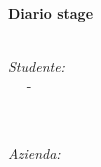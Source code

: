 \begin{titlepage}
    \HRule \\[0.4cm]
    { \huge \bfseries Diario stage}\\[0.4cm] %
    \HRule \\[1.5cm]
    
    
    \vspace{1.5cm}
    
    \begin{minipage}{0.4\textwidth}
        \begin{flushleft} \large
            \emph{Studente:}\\
            \nomeStudente\ \textsc{\cognomeStudente\ } - \matricolaStudente
        \end{flushleft}
    \end{minipage}
    ~
    \begin{minipage}{0.4\textwidth}
        \begin{flushright} \large
            \emph{Azienda:} \\
            \ragioneSocAzienda
        \end{flushright}
    \end{minipage}\\[2cm]
    
    
    \vfill 
    
\end{titlepage}

\renewcommand*\contentsname{\huge Indice}                    %
\renewcommand{\listfigurename}{Indice delle figure}
\renewcommand{\listtablename}{Indice delle tabelle}
